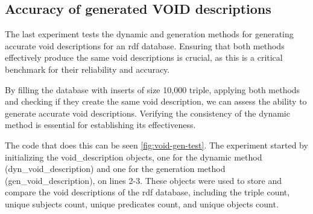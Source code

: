 \subsection{Accuracy of generated VOID descriptions}\label{subsec:accuracy-of-generated-void-descriptions}
The last experiment tests the dynamic and generation methods for generating accurate \gls{void} descriptions for an  \gls{rdf} database. Ensuring that both methods effectively produce the same \gls{void} descriptions is crucial, as this is a critical benchmark for their reliability and accuracy.

By filling the database with inserts of size 10,000 triple, applying both methods and checking if they create the same \gls{void} description, we can assess the ability to generate accurate \gls{void} descriptions. Verifying the consistency of the dynamic method is essential for establishing its effectiveness.

The code that does this can be seen \autoref{fig:void-gen-test}. The experiment started by initializing the void\_description objects, one for the dynamic method (dyn\_void\_description) and one for the generation method (gen\_void\_description), on lines 2-3. These objects were used to store and compare the \gls{void} descriptions of the  \gls{rdf} database, including the triple count, unique subjects count, unique predicates count, and unique objects count.

